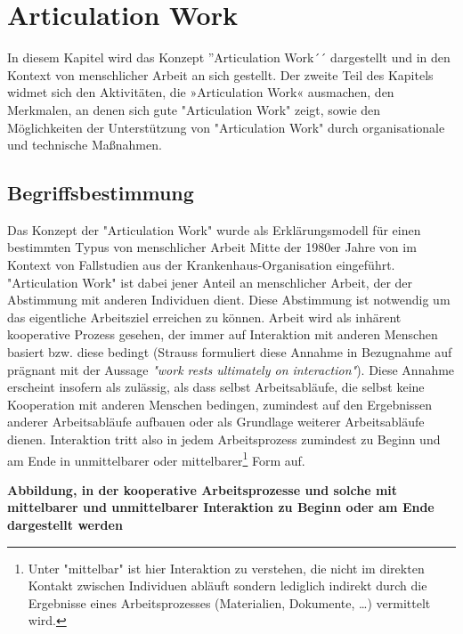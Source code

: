 \chapter{Articulation Work} %
\label{cha:articulation_work}

In diesem Kapitel wird das Konzept ''Articulation Work´´ dargestellt und in den Kontext von menschlicher Arbeit an sich gestellt. Der zweite Teil des Kapitels widmet sich den Aktivitäten, die »Articulation Work« ausmachen, den Merkmalen, an denen sich gute "Articulation Work" zeigt, sowie den Möglichkeiten der Unterstützung von "Articulation Work" durch organisationale und technische Maßnahmen.

\section{Begriffsbestimmung} %
\label{sec:begriffsbestimmung}

Das Konzept der "Articulation Work" wurde als Erklärungsmodell für einen bestimmten Typus von menschlicher Arbeit Mitte der 1980er Jahre von  \citet{Strauss85} im Kontext von Fallstudien aus der Krankenhaus-Organisation eingeführt. "Articulation Work" ist dabei jener Anteil an menschlicher Arbeit, der der Abstimmung mit anderen Individuen dient. Diese Abstimmung ist notwendig um das eigentliche Arbeitsziel erreichen zu können. Arbeit wird als inhärent kooperative Prozess gesehen, der immer auf Interaktion mit anderen Menschen basiert bzw. diese bedingt (Strauss formuliert diese Annahme in Bezugnahme auf \citet{Hughes71} prägnant mit der Aussage \emph{"work rests ultimately on interaction"}). Diese Annahme erscheint insofern als zulässig, als dass selbst Arbeitsabläufe, die selbst keine Kooperation mit anderen Menschen bedingen, zumindest auf den Ergebnissen anderer Arbeitsabläufe aufbauen oder als Grundlage weiterer Arbeitsabläufe dienen. Interaktion tritt also in jedem Arbeitsprozess zumindest zu Beginn und am Ende in unmittelbarer oder mittelbarer\footnote{Unter "mittelbar" ist hier Interaktion zu verstehen, die nicht im direkten Kontakt zwischen Individuen abläuft sondern  lediglich indirekt durch die Ergebnisse eines Arbeitsprozesses (Materialien, Dokumente, \ldots) vermittelt wird.} Form auf. 

\textbf{Abbildung, in der kooperative Arbeitsprozesse und solche mit mittelbarer und unmittelbarer Interaktion zu Beginn oder am Ende dargestellt werden}

